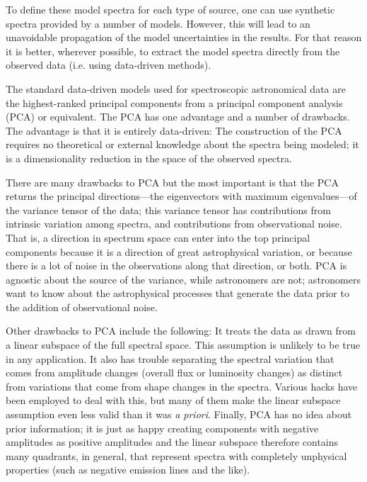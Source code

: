 \documentclass[apj]{emulateapj}
\begin{document}
To define these model spectra for each type of source, one can use synthetic spectra provided by a number of models. However, this will lead to an unavoidable propagation of the model uncertainties in the results. For that reason it is better, wherever possible, to extract the model spectra directly from the observed data (i.e. using data-driven methods).

The standard data-driven models used for spectroscopic astronomical data are the highest-ranked principal components from a principal component analysis (PCA) or equivalent. The PCA has one advantage and a number of drawbacks.  The advantage is that it is entirely data-driven: The construction of the PCA requires no theoretical or external knowledge about the spectra being modeled; it is a dimensionality reduction in the space of the observed spectra.

There are many drawbacks to PCA but the most important is that the PCA returns the principal directions---the eigenvectors with maximum eigenvalues---of the variance tensor of the data; this variance tensor has contributions from intrinsic variation among spectra, and contributions from observational noise.  That is, a direction in spectrum space can enter into the top principal components because it is a direction of great astrophysical variation, or because there is a lot of noise in the observations along that direction, or both.  PCA is agnostic about the source of the variance, while astronomers are not; astronomers want to know about the astrophysical processes that generate the data prior to the addition of observational noise.

Other drawbacks to PCA include the following: It treats the data as drawn from a linear subspace of the full spectral space. This
assumption is unlikely to be true in any application.  It also has trouble separating the spectral variation that comes from amplitude
changes (overall flux or luminosity changes) as distinct from variations that come from shape changes in the spectra.  Various hacks
have been employed to deal with this, but many of them make the linear subspace assumption even less valid than it was \textit{a priori}. Finally, PCA has no idea about prior information; it is just as happy creating components with negative amplitudes as positive amplitudes and the linear subspace therefore contains many quadrants, in general, that represent spectra with completely unphysical properties (such as negative emission lines and the like).
\end{document}
